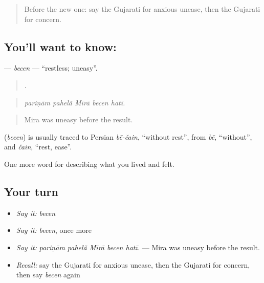 \label{lesson:GU-C454-becen}



\begin{quote}
Before the new one: say the Gujarati for anxious unease, then the Gujarati for concern.
\end{quote}

\subsection*{You'll want to know: }
\textbf{} — \emph{becen} — \textquotedblleft{}restless; uneasy\textquotedblright{}.

\begin{quote}
    .
\end{quote}

\begin{quote}
\emph{pariṇām pahelā̃ Mīrā becen hatī.}
\end{quote}

\begin{quote}
Mira was uneasy before the result.
\end{quote}

\begin{cousinweb}
\textbf{} (\emph{becen}) is usually traced to Persian \emph{bē-čain}, \textquotedblleft{}without rest\textquotedblright{}, from \emph{bē}, \textquotedblleft{}without\textquotedblright{}, and \emph{čain}, \textquotedblleft{}rest, ease\textquotedblright{}.
\end{cousinweb}

\begin{grammarlens}[title={What you've built}]
One more word for describing what you lived and felt.
\end{grammarlens}

\subsection*{Your turn}
\begin{itemize}
\raggedright
  \item \emph{Say it:} \emph{becen}
  \item \emph{Say it:} \emph{becen}, once more
  \item \emph{Say it:} \emph{pariṇām pahelā̃ Mīrā becen hatī.} — Mira was uneasy before the result.
  \item \emph{Recall:} say the Gujarati for anxious unease, then the Gujarati for concern, then say \emph{becen} again
\end{itemize}

